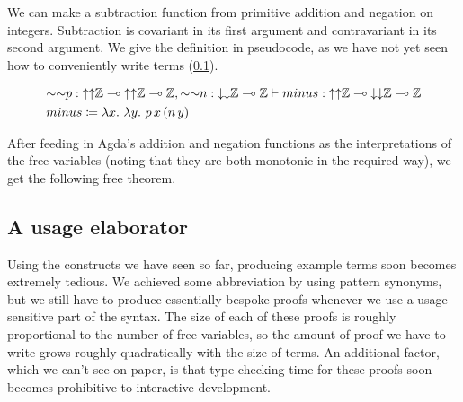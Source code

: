 \begin{example}\label{thm:minus}
  We can make a subtraction function from primitive addition and negation on
  integers.
  Subtraction is covariant in its first argument and contravariant in its
  second argument.
  We give the definition in pseudocode, as we have not yet seen how to
  conveniently write terms (\cref{sec:usage-elaborator}).

  \begin{align*}
    &{\sim\sim}p :
      {\uparrow\uparrow}\mathbb Z \multimap
      {\uparrow\uparrow}\mathbb Z \multimap \mathbb Z,
      {\sim\sim}n : {\downarrow\downarrow}\mathbb Z \multimap \mathbb Z
      \vdash \mathnormal{minus} :
      {\uparrow\uparrow}\mathbb Z \multimap
      {\downarrow\downarrow}\mathbb Z \multimap
      \mathbb Z
    \\
    &\mathnormal{minus} \coloneqq \lambda x.~\lambda y.~p\,x\,(n\,y)
  \end{align*}

  After feeding in Agda's addition and negation functions as the
  interpretations of the free variables (noting that they are both monotonic
  in the required way), we get the following free theorem.





\end{example}

\subsection{A usage elaborator}\label{sec:usage-elaborator}

Using the constructs we have seen so far, producing example terms soon becomes
extremely tedious.
We achieved some abbreviation by using pattern synonyms, but we still have to
produce essentially bespoke proofs whenever we use a usage-sensitive part of the
syntax.
The size of each of these proofs is roughly proportional to the number of free
variables, so the amount of proof we have to write grows roughly quadratically
with the size of terms.
An additional factor, which we can't see on paper, is that type checking time
for these proofs soon becomes prohibitive to interactive development.

